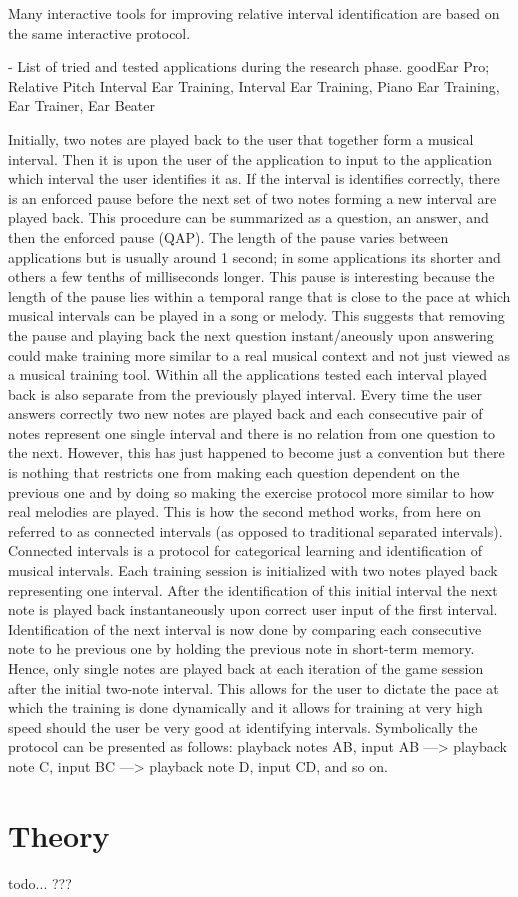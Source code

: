 Many interactive tools for improving relative interval identification are based on the same interactive protocol.

- List of tried and tested applications during the research phase. goodEar Pro; Relative Pitch Interval Ear Training, Interval Ear Training, Piano Ear Training, Ear Trainer, Ear Beater

Initially, two notes are played back to the user that together form a musical interval. Then it is upon the user of the application to input to the application which interval the user identifies it as. If the interval is identifies correctly, there is an enforced pause before the next set of two notes forming a new interval are played back. This procedure can be summarized as a question, an answer, and then the enforced pause (QAP).
The length of the pause varies between applications but is usually around 1 second; in some applications its shorter and others a few tenths of milliseconds longer.
This pause is interesting because the length of the pause lies within a temporal range that is close to the pace at which musical intervals can be played in a song or melody. This suggests that removing the pause and playing back the next question instant/aneously upon answering could make training more similar to a real musical context and not just viewed as a musical training tool.
Within all the applications tested each interval played back is also separate from the previously played interval. Every time the user answers correctly two new notes are played back and each consecutive pair of notes represent one single interval and there is no relation from one question to the next. However, this has just happened to become just a convention but there is nothing that restricts one from making each question dependent on the previous one and by doing so making the exercise protocol more similar to how real melodies are played. This is how the second method works, from here on referred to as connected intervals (as opposed to traditional separated intervals).
Connected intervals is a protocol for categorical learning and identification of musical intervals. Each training session is initialized with two notes played back representing one interval. After the identification of this initial interval the next note is played back instantaneously upon correct user input of the first interval. Identification of the next interval is now done by comparing each consecutive note to he previous one by holding the previous note in short-term memory. Hence, only single notes are played back at each iteration of the game session after the initial two-note interval. This allows for the user to dictate the pace at which the training is done dynamically and it allows for training at very high speed should the user be very good at identifying intervals. Symbolically the protocol can be presented as follows: playback notes AB, input AB —> playback note C, input BC —> playback note D, input CD, and so on.

\section{Theory}

todo... ???
